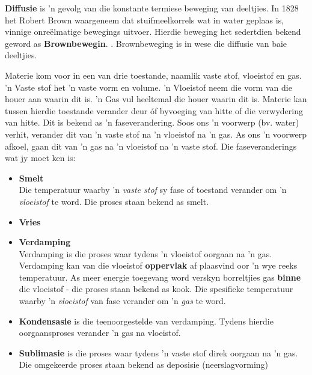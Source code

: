 \par 
\label{m38736*id10987324}\textbf{Diffusie} is 'n gevolg van die konstante termiese beweging van deeltjies. In 1828 het Robert Brown waargeneem dat stuifmeelkorrels wat in water geplaas is, vinnige onreëlmatige bewegings uitvoer. Hierdie beweging het sedertdien bekend geword as \textbf{Brownbewegin}. . Brownbeweging is in wese die diffusie van baie deeltjies.
\par 
\label{m38736*id48327}Materie kom voor in een van drie toestande, naamlik vaste stof, vloeistof en gas. 'n Vaste stof het 'n vaste vorm en volume. 'n Vloeistof neem die vorm van die houer aan waarin dit is. 'n Gas vul heeltemal die houer waarin dit is. Materie kan tussen hierdie toestande verander deur óf byvoeging van hitte of die verwydering van hitte. Dit is bekend as 'n faseverandering. Soos ons 'n voorwerp (bv. water) verhit, verander dit van 'n vaste stof na 'n vloeistof na 'n gas. As ons 'n voorwerp afkoel, gaan dit van 'n gas na 'n vloeistof na 'n vaste stof. Die faseveranderings wat jy moet ken is:
\label{m38736*id02341}\begin{itemize}[noitemsep]
\item \textbf{Smelt} \\ 
 { \label{m38734*meaningfhsst!!!underscore!!!id276}
Die temperatuur waarby 'n \textsl{vaste stof} sy fase of toestand verander om 'n \textsl{vloeistof} te word. Die proses staan bekend as smelt. } 
\item \textbf{Vries} \\
\item \textbf{Verdamping} \\
Verdamping is die proses waar tydens 'n vloeistof oorgaan na 'n gas. Verdamping kan van die vloeistof \textbf{oppervlak} af plaasvind oor 'n wye reeks temperatuur. As meer energie toegevang word verskyn borreltjies gas \textbf{binne} die vloeistof - die proses staan bekend as kook.
 { \label{m38734*meaningfhsst!!!underscore!!!id282}
Die spesifieke temperatuur waarby 'n \textsl{vloeistof} van fase verander om 'n \textsl{gas} te word.} 
\item \textbf{Kondensasie} is die teenoorgestelde van verdamping. Tydens hierdie oorgaansproses verander 'n gas na vloeistof.
\item \textbf{Sublimasie} is die proses waar tydens 'n vaste stof direk oorgaan na 'n gas. Die omgekeerde proses staan bekend as deposisie (neerslagvorming)\end{itemize}
